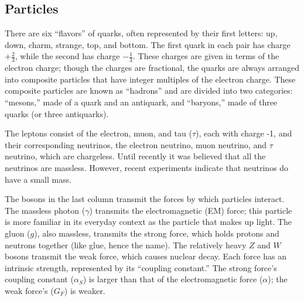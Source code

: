 \subsection{Particles}
\label{theory:particles}
There are six ``flavors'' of quarks, 
often represented by their first letters: 
up, down, charm, strange, top, and bottom.  
The first quark in each pair has charge $+\frac{2}{3}$, 
while the second has charge $-\frac{1}{3}$.  
These charges are given in terms of the electron charge; 
though the charges are fractional, 
the quarks are always arranged into composite 
particles that have integer multiples of the electron charge.  
These composite particles are known as ``hadrons'' 
and are divided into two categories: 
``mesons,'' made of a quark and an antiquark, 
and ``baryons,'' made of three quarks 
(or three antiquarks).  

The leptons consist of the electron, muon, and tau ($\tau$), 
each with charge -1, 
and their corresponding neutrinos, 
the electron neutrino, muon neutrino, and $\tau$ neutrino, 
which are chargeless.  
Until recently it was believed that all the neutrinos are massless.  
However, recent experiments indicate 
that neutrinos do have a small mass.  %

The bosons in the last column transmit the forces 
by which particles interact.  
The massless photon ($\gamma$) transmits the 
electromagnetic (EM) force; 
this particle is more familiar in its 
everyday context as the particle that makes up light.  
The gluon ($g$), also massless, transmits the strong force, 
which holds protons and neutrons together     %
(like glue, hence the name).  
The relatively heavy $Z$ and $W$ bosons 
transmit the weak force, 
which causes nuclear decay.  
Each force has an intrinsic strength, %
represented by its ``coupling constant.''  
The strong force's coupling constant ($\alpha_S$)
is larger than that 
of the electromagnetic force ($\alpha$); 
the weak force's ($G_F$) is weaker.  

